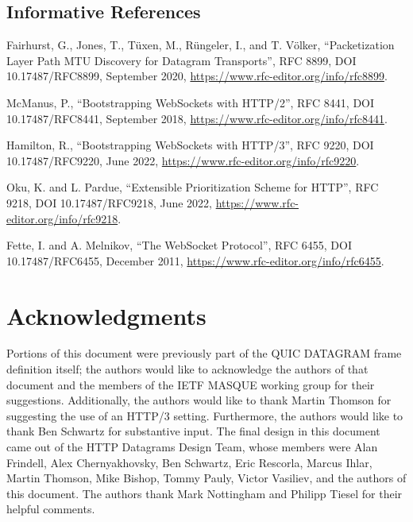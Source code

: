 \documentclass{article}
\begin{document}
\subsection{Informative References}

\begin{description}[style=unboxed, leftmargin=1cm]
\item[{[DPLPMTUD]}] Fairhurst, G., Jones, T., T\"uxen, M., R\"ungeler, I., and T.
   V\"olker, ``Packetization Layer Path MTU Discovery for
   Datagram Transports'', RFC 8899, DOI 10.17487/RFC8899,
   September 2020, \url{https://www.rfc-editor.org/info/rfc8899}.

\item[{[EXT-CONNECT2]}] McManus, P., ``Bootstrapping WebSockets with HTTP/2'',
   RFC 8441, DOI 10.17487/RFC8441, September 2018,
   \url{https://www.rfc-editor.org/info/rfc8441}.

\item[{[EXT-CONNECT3]}] Hamilton, R., ``Bootstrapping WebSockets with HTTP/3'',
   RFC 9220, DOI 10.17487/RFC9220, June 2022,
   \url{https://www.rfc-editor.org/info/rfc9220}.

\item[{[PRIORITY]}] Oku, K. and L. Pardue, ``Extensible Prioritization Scheme
   for HTTP'', RFC 9218, DOI 10.17487/RFC9218, June 2022,
   \url{https://www.rfc-editor.org/info/rfc9218}.

\item[{[WEBSOCKET]}] Fette, I. and A. Melnikov, ``The WebSocket Protocol'',
   RFC 6455, DOI 10.17487/RFC6455, December 2011,
   \url{https://www.rfc-editor.org/info/rfc6455}.
\end{description}

\section*{Acknowledgments}

Portions of this document were previously part of the QUIC DATAGRAM
frame definition itself; the authors would like to acknowledge the
authors of that document and the members of the IETF MASQUE working
group for their suggestions.  Additionally, the authors would like to
thank Martin Thomson for suggesting the use of an HTTP/3 setting.
Furthermore, the authors would like to thank Ben Schwartz for
substantive input.  The final design in this document came out of the
HTTP Datagrams Design Team, whose members were Alan Frindell, Alex
Chernyakhovsky, Ben Schwartz, Eric Rescorla, Marcus Ihlar, Martin
Thomson, Mike Bishop, Tommy Pauly, Victor Vasiliev, and the authors
of this document.  The authors thank Mark Nottingham and Philipp
Tiesel for their helpful comments.
\end{document}
